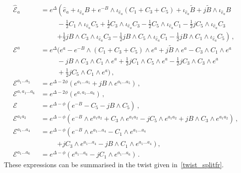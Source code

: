 \documentclass[debug]{phd}
\begin{document}
						\begin{equation}\label{splitframe_explicit}
							\begin{split}
								\hat{\mathcal{E}}_a &= e^{\Delta} \left(\hat e_a + \iota_{\hat e_a}B + e^{-B}\wedge\iota_{\hat e_a}(C_1 + C_3 + C_5) + \iota_{\hat e_a}\tilde{B} + j\tilde{B} \wedge \iota_{\hat e_a}B \right. \\
												& \phantom{= e^{\Delta}} - \tfrac{1}{2} C_1 \wedge \iota_{\hat e_a}C_5 +\tfrac{1}{2} C_3 \wedge \iota_{\hat e_a} C_3 -\tfrac{1}{2} C_5 \wedge \iota_{\hat e_a} C_1 - \tfrac{1}{2} j C_5 \wedge \iota_{\hat e_a}C_3 \\
												& \phantom{= e^{\Delta}} \left. + \tfrac{1}{2}j B\wedge C_3 \wedge \iota_{\hat e_a}C_3 -\tfrac{1}{2}j B\wedge C_5 \wedge \iota_{\hat e_a}C_1 -\tfrac{1}{2}j B\wedge C_1 \wedge \iota_{\hat e_a}C_5 \right) \, , \\[2mm]
								\mathcal{E}^a &= e^{\Delta} \big(e^a - e^{-B}\wedge (C_1+ C_3 + C_5) \wedge e^a + j\tilde{B} \wedge e^a - C_3 \wedge C_1 \wedge e^a \\
											& \phantom{=e^{\Delta}} - j B \wedge C_3 \wedge C_1\wedge e^a + \tfrac{1}{2}j C_1 \wedge C_5\wedge e^a - \tfrac{1}{2} j C_3 \wedge C_3\wedge e^a \\
											& \phantom{=e^{\Delta}} + \tfrac{1}{2}j C_5 \wedge C_1\wedge e^a \big)\, , \\[2mm]
								\mathcal{E}^{a_1 \ldots a_5} &= e^{\Delta-2\phi}\left(e^{a_1 \ldots a_5} + jB \wedge e^{a_1 \ldots a_5} \right)\, , \\[2mm]
								\mathcal{E}^{a,a_1\ldots a_6} &= e^{\Delta-2\phi}\left(e^{a,a_1 \ldots a_6} \right)\, , \\[2mm]
								\mathcal{E} &= e^{\Delta-\phi} \left( e^{-B} - C_5 - j B\wedge C_5 \right)\ , \\[2mm]
								\mathcal{E}^{a_1 a_2} &= e^{\Delta-\phi} \left( e^{-B}\wedge e^{a_1 a_2} + C_3\wedge e^{a_1 a_2} - jC_5 \wedge e^{a_1 a_2} + jB \wedge C_3\wedge e^{a_1 a_2} \right)\, , \\[2mm]
								\mathcal{E}^{a_1 \ldots a_4} &= e^{\Delta-\phi}\left(e^{-B}\wedge e^{a_1 \ldots a_4} - C_1 \wedge e^{a_1 \ldots a_4} \right. \\
											 & \phantom{=e^{\Delta}}\left. + jC_3 \wedge e^{a_1 \ldots a_4} -jB\wedge C_1 \wedge e^{a_1\ldots a_4} \right) , \\[2mm]
								\mathcal{E}^{a_1 \ldots a_6} &= e^{\Delta-\phi}\left(e^{a_1 \ldots a_6} - j C_1 \wedge e^{a_1\ldots a_6} \right)\, .
							\end{split}
						\end{equation}
				These expressions can be summarised in the twist given in~\eqref{twist_splitfr}.
\end{document}
